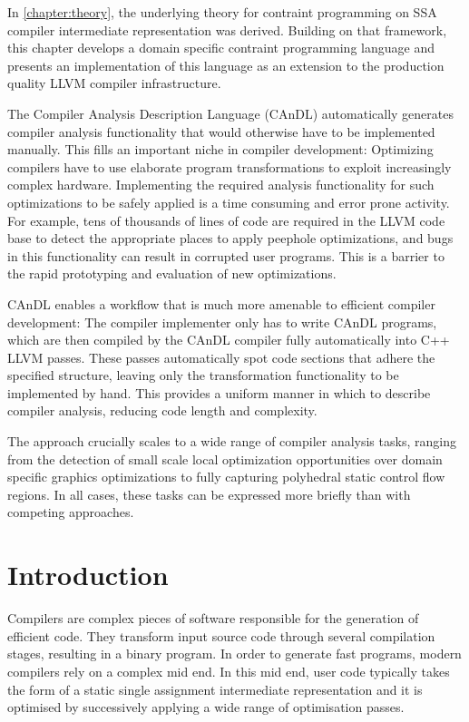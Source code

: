 
    In \autoref{chapter:theory}, the underlying theory for contraint
    programming on SSA compiler intermediate representation was derived.
    Building on that framework, this chapter develops a domain specific
    contraint programming language and presents an implementation of this
    language as an extension to the production quality LLVM compiler
    infrastructure.

    The Compiler Analysis Description Language (CAnDL) automatically generates
    compiler analysis functionality that would otherwise have to be implemented
    manually.
    This fills an important niche in compiler development:
    Optimizing compilers have to use elaborate program transformations to exploit
    increasingly complex hardware.
    Implementing the required analysis functionality for such optimizations to
    be safely applied is a time consuming and error prone activity.
    For example, tens of thousands of lines of code are required in the LLVM
    code base to detect the appropriate places to apply peephole optimizations,
    and bugs in this functionality can result in corrupted user programs.
    This is a barrier to the rapid prototyping and evaluation of new
    optimizations.

    CAnDL enables a workflow that is much more amenable to efficient compiler
    development:
    The compiler implementer only has to write CAnDL programs, which are then
    compiled by the CAnDL compiler fully automatically into C++ LLVM passes.
    These passes automatically spot code sections that adhere the specified
    structure, leaving only the transformation functionality to be implemented
    by hand.
    This provides a uniform manner in which to describe compiler analysis,
    reducing code length and complexity.

    The approach crucially scales to a wide range of compiler analysis tasks,
    ranging from the detection of small scale local optimization opportunities
    over domain specific graphics optimizations to fully capturing polyhedral
    static control flow regions.
    In all cases, these tasks can be  expressed more briefly than with competing
    approaches.

\section{Introduction}

    Compilers are complex pieces of software responsible for the generation of
    efficient code.
    They transform input source code through several compilation stages,
    resulting in a binary program.
    In order to generate fast programs, modern compilers rely on a complex mid
    end.
    In this mid end, user code typically takes the form of a static single
    assignment intermediate representation and it is optimised by successively
    applying a wide range of optimisation passes.

